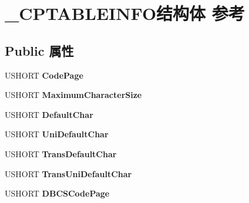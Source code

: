 \hypertarget{struct___c_p_t_a_b_l_e_i_n_f_o}{}\section{\+\_\+\+C\+P\+T\+A\+B\+L\+E\+I\+N\+F\+O结构体 参考}
\label{struct___c_p_t_a_b_l_e_i_n_f_o}
\subsection*{Public 属性}
\begin{DoxyCompactItemize}
\item 
\mbox{\label{struct___c_p_t_a_b_l_e_i_n_f_o_a8a3123b676d715f539d15efbba4a6d43}} 
U\+S\+H\+O\+RT {\bfseries Code\+Page}
\item 
\mbox{\label{struct___c_p_t_a_b_l_e_i_n_f_o_aaf276bd6ba41b5390e1cd840bb25f0f0}} 
U\+S\+H\+O\+RT {\bfseries Maximum\+Character\+Size}
\item 
\mbox{\label{struct___c_p_t_a_b_l_e_i_n_f_o_a0dacab7395f60003640a1b465d97af3f}} 
U\+S\+H\+O\+RT {\bfseries Default\+Char}
\item 
\mbox{\label{struct___c_p_t_a_b_l_e_i_n_f_o_aa84e40cd8897a75408b5527acc097fa5}} 
U\+S\+H\+O\+RT {\bfseries Uni\+Default\+Char}
\item 
\mbox{\label{struct___c_p_t_a_b_l_e_i_n_f_o_a4c42a2dba386aeba472a7edd89e0f7a3}} 
U\+S\+H\+O\+RT {\bfseries Trans\+Default\+Char}
\item 
\mbox{\label{struct___c_p_t_a_b_l_e_i_n_f_o_ac08f82ebaa28452b3bec34a8e24a004b}} 
U\+S\+H\+O\+RT {\bfseries Trans\+Uni\+Default\+Char}
\item 
\mbox{\label{struct___c_p_t_a_b_l_e_i_n_f_o_a4bbfa4bb479776ee25b40be9981aa714}} 
U\+S\+H\+O\+RT {\bfseries D\+B\+C\+S\+Code\+Page}
\item 
\mbox{\label{struct___c_p_t_a_b_l_e_i_n_f_o_a5ca156936e99174f38760c52cd6ca428}} 

\end{DoxyCompactItemize}
